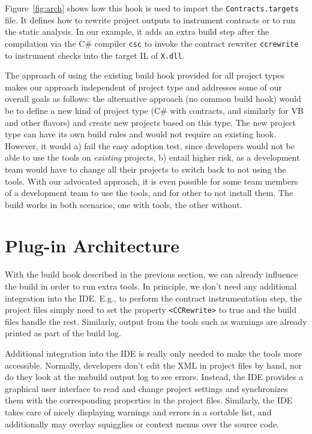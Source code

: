 \documentclass[10pt, conference, compsocconf]{IEEEtran}
\newcommand{\codefamily}{\sffamily}
\newcommand{\csharp}{C\#}
\newcommand{\code}[1]{\lstinline[basicstyle=\codefamily\small]{#1}}
\begin{document}
Figure~\ref{fig:arch} shows how this hook is used to import the
\code{Contracts.targets} file. It defines how to rewrite project
outputs to instrument contracts or to run the static analysis.
In our example, it adds an extra build step after the
compilation via the \csharp{} compiler \code{csc} to invoke the
contract rewriter \code{ccrewrite} to instrument checks into the
target IL of \code{X.dll}.

The approach of using the existing build hook provided for all project
types makes our approach independent of project type and addresses
some of our overall goals as follows: the alternative approach (no
common build hook) would be to define
a new kind of project type (\csharp{} with contracts, and similarly
for VB and other flavors) and create new
  projects based on this type. The new project type can have its own
  build rules and would not require an existing hook. However, it
  would a) fail the easy adoption test, since developers would not be
  able to use the tools on \emph{existing} projects, b) entail higher risk, as a
  development team would have to change all their projects to switch
  back to not using the tools. With our advocated approach, it is even
  possible for some team members of a development team to use the
  tools, and for other to not install them. The build works in both
  scenarios, one with tools, the other without.

\section{Plug-in Architecture}
\label{sec:plugins}
\noindent
With the build hook described in the previous section, we can
already influence the build in order to run extra tools. In principle, we
don't need any additional integration into the IDE. E.g., to perform
the contract instrumentation step, the project files simply
need to set the property \code{<CCRewrite>} to true and the build
files handle the rest. Similarly, output from the tools such as
warnings are already printed as part of the build log.

Additional integration into the IDE is really only needed to make the tools
more accessible. Normally, developers don't edit the XML in project 
files by hand, nor do they look at the msbuild output log to see
errors. Instead, the IDE provides a graphical user interface to read
and change project settings and synchronizes them with the corresponding properties in the
project files. Similarly, the IDE takes care of
nicely displaying warnings and errors in a sortable list, and
additionally may overlay squigglies or context menus over the source code.
\end{document}

